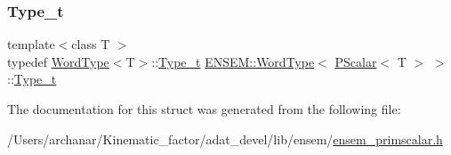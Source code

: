 \mbox{\label{structENSEM_1_1WordType_3_01PScalar_3_01T_01_4_01_4_a18e643a2710c1d27fed12cd1c6b2bfaf}} 
\subsubsection{\texorpdfstring{Type\_t}{Type\_t}\hspace{0.1cm}{\footnotesize\ttfamily [2/2]}}
{\footnotesize\ttfamily template$<$class T $>$ \\
typedef \mbox{\hyperlink{structENSEM_1_1WordType}{Word\+Type}}$<$T$>$\+::\mbox{\hyperlink{structENSEM_1_1WordType_3_01PScalar_3_01T_01_4_01_4_a18e643a2710c1d27fed12cd1c6b2bfaf}{Type\+\_\+t}} \mbox{\hyperlink{structENSEM_1_1WordType}{E\+N\+S\+E\+M\+::\+Word\+Type}}$<$ \mbox{\hyperlink{classENSEM_1_1PScalar}{P\+Scalar}}$<$ T $>$ $>$\+::\mbox{\hyperlink{structENSEM_1_1WordType_3_01PScalar_3_01T_01_4_01_4_a18e643a2710c1d27fed12cd1c6b2bfaf}{Type\+\_\+t}}}



The documentation for this struct was generated from the following file\+:\begin{DoxyCompactItemize}
\item 
/\+Users/archanar/\+Kinematic\+\_\+factor/adat\+\_\+devel/lib/ensem/\mbox{\hyperlink{lib_2ensem_2ensem__primscalar_8h}{ensem\+\_\+primscalar.\+h}}\end{DoxyCompactItemize}
